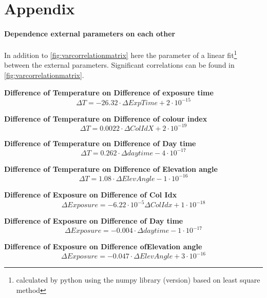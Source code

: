 \documentclass  [
  paper    = a4,
  BCOR     = 10mm,
  twoside,
  fontsize = 12pt,
  fleqn,
  toc      = bibnumbered,
  toc      = listofnumbered,
  numbers  = noendperiod,
  headings = normal,
  listof   = leveldown,
  version  = 3.03
]                                       {scrreprt}
\begin{document}
\part{Appendix}
\begin{appendix}
	\subsection*{Dependence external parameters on each other}
	In addition to \cref{fig:varcorrelationmatrix} here the parameter of a linear fit\footnote{calculated by python using the numpy library (version) based on least square method} between the external parameters. Significant correlations can be found in \cref{fig:varcorrelationmatrix}.
	
	\textbf{Difference of Temperature on  Difference of exposure time}
	\begin{equation}
	\Delta T =  -26.32\cdot \Delta ExpTime + 2\cdot 10^{-15}
	\end{equation}
	
	\textbf{Difference of Temperature on  Difference of colour index}
	\begin{equation}
	\Delta T = 0.0022\cdot \Delta ColIdX +2\cdot 10^{-19}
	\end{equation}
	
	\textbf{Difference of Temperature on  Difference of Day time}
	\begin{equation}
	\Delta T =0.262\cdot \Delta daytime -4\cdot 10^{-17}
	\end{equation}
	
	\textbf{Difference of Temperature on  Difference of Elevation angle}
	\begin{equation}
	\Delta T =1.08\cdot \Delta Elev Angle -1\cdot 10^{-16}
	\end{equation}
	
	\textbf{Difference of Exposure on  Difference of  Col Idx}
	\begin{equation}
	\Delta Exposure  =-6.22\cdot 10^{-5} \Delta Col Idx  +1\cdot 10^{-18}
	\end{equation}
	
	\textbf{Difference of  Exposure on  Difference of Day time}
	\begin{equation}
	\Delta Exposure  =-0.004\cdot \Delta daytime -1\cdot 10^{-17}
	\end{equation}
	
	\textbf{Difference of  Exposure  on  Difference ofElevation angle}
	\begin{equation}
	\Delta Exposure  =-0.047\cdot \Delta  ElevAngle +3\cdot 10^{-16}
	\end{equation}
	

\end{appendix}
\end{document}
